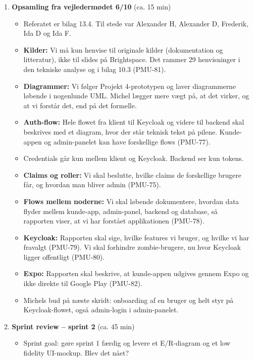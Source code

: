 \documentclass[a4paper,11pt]{article}
\begin{document}
\begin{enumerate}
    \item \textbf{Opsamling fra vejledermødet 6/10} (ca. 15 min)
    \begin{itemize}
        \item Referatet er bilag 13.4. Til stede var Alexander H, Alexander D, Frederik, Ida D og Ida F.
        \item \textbf{Kilder:} Vi må kun henvise til originale kilder (dokumentation og litteratur), ikke til slides på Brightspace. Det rammer 29 henvisninger i den tekniske analyse og i bilag 10.3 (PMU-81).
        \item \textbf{Diagrammer:} Vi følger Projekt 4-prototypen og laver diagrammerne løbende i nogenlunde UML. Michel lægger mere vægt på, at det virker, og at vi forstår det, end på det formelle.
        \item \textbf{Auth-flow:} Hele flowet fra klient til Keycloak og videre til backend skal beskrives med et diagram, hvor der står teknisk tekst på pilene. Kunde-appen og admin-panelet kan have forskellige flows (PMU-77).
        \item Credentials går kun mellem klient og Keycloak. Backend ser kun tokens.
        \item \textbf{Claims og roller:} Vi skal beslutte, hvilke claims de forskellige brugere får, og hvordan man bliver admin (PMU-75).
        \item \textbf{Flows mellem noderne:} Vi skal løbende dokumentere, hvordan data flyder mellem kunde-app, admin-panel, backend og database, så rapporten viser, at vi har forstået applikationen (PMU-78).
        \item \textbf{Keycloak:} Rapporten skal sige, hvilke features vi bruger, og hvilke vi har fravalgt (PMU-79). Vi skal forhindre zombie-brugere, nu hvor Keycloak ligger offentligt (PMU-80).
        \item \textbf{Expo:} Rapporten skal beskrive, at kunde-appen udgives gennem Expo og ikke direkte til Google Play (PMU-82).
        \item Michels bud på næste skridt: onboarding af en bruger og helt styr på Keycloak-flowet, også admin-login i admin-panelet.
    \end{itemize}
    \item \textbf{Sprint review -- sprint 2} (ca. 45 min)
    \begin{itemize}
        \item Sprint goal: gøre sprint 1 færdig og levere et E/R-diagram og et low fidelity UI-mockup. Blev det nået?

\end{itemize}
\end{enumerate}
\end{document}
